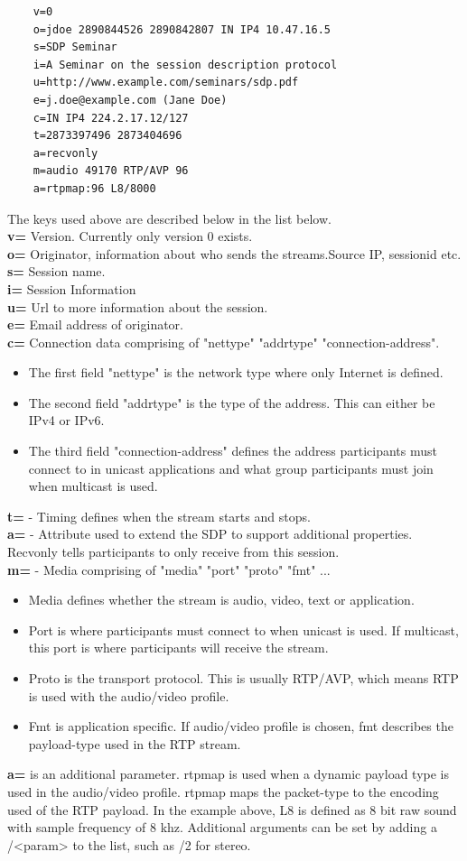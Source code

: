 \begin{verbatim}
    v=0
    o=jdoe 2890844526 2890842807 IN IP4 10.47.16.5
    s=SDP Seminar
    i=A Seminar on the session description protocol
    u=http://www.example.com/seminars/sdp.pdf
    e=j.doe@example.com (Jane Doe)
    c=IN IP4 224.2.17.12/127
    t=2873397496 2873404696
    a=recvonly
    m=audio 49170 RTP/AVP 96
    a=rtpmap:96 L8/8000
\end{verbatim}
The keys used above are described below in the list below. \\
\textbf{v=} Version. Currently only version 0 exists. \\
\textbf{o=} Originator, information about who sends the streams.Source IP, sessionid etc. \\
\textbf{s=} Session name. \\
\textbf{i=} Session Information \\
\textbf{u=} Url to more information about the session.\\
\textbf{e=} Email address of originator.\\
\textbf{c=} Connection data comprising of "nettype" "addrtype" "connection-address".
\begin{itemize}
	\item The first field "nettype" is the network type where only Internet is defined. 
	\item The second field "addrtype" is the type of the address. This can either be IPv4 or IPv6.
	\item The third field "connection-address" defines the address participants must connect to in unicast applications and what group participants must join when multicast is used.
\end{itemize}
\textbf{t=} - Timing defines when the stream starts and stops. \\
\textbf{a=} - Attribute used to extend the SDP to support additional properties. Recvonly tells participants to only receive from this session. \\
\textbf{m=} - Media comprising of "media" "port" "proto" "fmt" ...
\begin{itemize}
	\item Media defines whether the stream is audio, video, text or application.
	\item Port is where participants must connect to when unicast is used. If multicast, this port is where participants will receive the stream.
	\item Proto is the transport protocol. This is usually RTP/AVP, which means RTP is used with the audio/video profile.
	\item Fmt is application specific. If audio/video profile is chosen, fmt describes the payload-type used in the RTP stream.
\end{itemize}
\textbf{a=} is an additional parameter. rtpmap is used when a dynamic payload type is used in the audio/video profile. rtpmap maps the packet-type to the encoding used of the RTP payload. In the example above, L8 is defined as 8 bit raw sound with sample frequency of 8 khz. Additional arguments can be set by adding a /<param> to the list, such as /2 for stereo.

